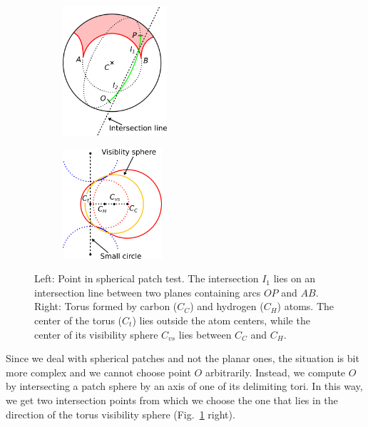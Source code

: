 \begin{figure}[htp]
  \centering
  \begin{subfigure}[c]{0.52\columnwidth}
    \centering
    \includegraphics[height=1.9in]{image/patch.png}
  \end{subfigure}%
  \quad
  \begin{subfigure}[c]{0.44\columnwidth}
    \centering
    \includegraphics[height=1.6in]{image/outer.png}
  \end{subfigure}
\caption{Left: Point in spherical patch test. The intersection $I_1$ lies on an intersection line between two planes containing arcs $OP$ and $AB$. Right: Torus formed by carbon ($C_C$) and hydrogen ($C_H$) atoms. The center of the torus ($C_{t}$) lies outside the atom centers, while the center of its visibility sphere $C_{vs}$ lies between $C_C$ and $C_H$.}
\label{fig:outer-point}
\end{figure}

Since we deal with spherical patches and not the planar ones, the situation is bit more complex and we cannot choose point $O$ arbitrarily. 
Instead, we compute $O$ by intersecting a patch sphere by an axis of one of its delimiting tori.
In this way, we get two intersection points from which we choose the one that lies in the direction of the torus visibility sphere (Fig.~\ref{fig:outer-point} right).

